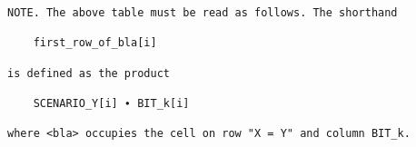 \documentclass[varwidth=\maxdimen,margin=0.5cm,multi={verbatim}]{standalone}
\begin{document}
\begin{verbatim}
NOTE. The above table must be read as follows. The shorthand

	first_row_of_bla[i]

is defined as the product

	SCENARIO_Y[i] ∙ BIT_k[i]

where <bla> occupies the cell on row "X = Y" and column BIT_k.

\end{verbatim}
\end{document}
